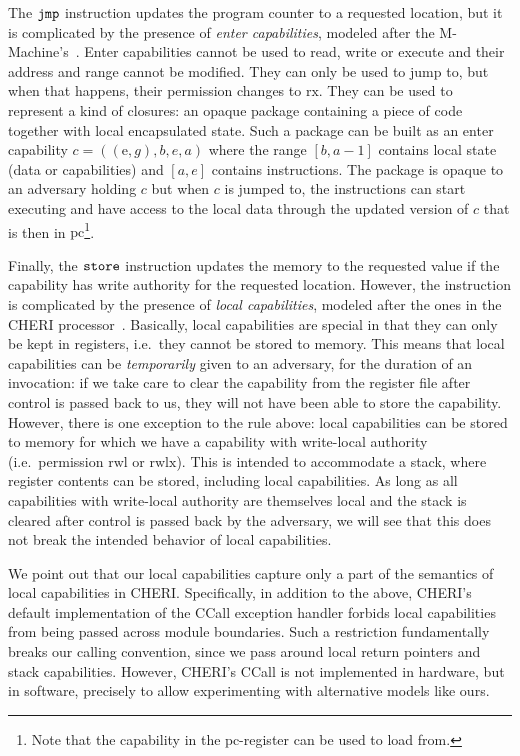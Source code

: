 \documentclass[compsoc,conference,letterpaper,fleqn]{IEEEtran}
\newcommand\lau[1]{{\color{purple} \sf \footnotesize {LS: #1}}\\}
\renewcommand\lau[1]{}
\newcommand{\var}[1]{\mathit{#1}}
\newcommand{\gl}{\var{g}}
\newcommand{\pcreg}{\mathrm{pc}}
\newcommand{\addr}{\var{a}}
\newcommand{\start}{\var{b}}
\newcommand{\addrend}{\var{e}}
\newcommand{\zinstr}[1]{\mathtt{#1}}
\newcommand{\oneinstr}[2]{
  \ifthenelse{\equal{#2}{}}
  {\zinstr{#1}}
  {\zinstr{#1} \; #2}
}
\newcommand{\jmp}[1]{\oneinstr{jmp}{#1}}
\newcommand{\twoinstr}[3]{
  \ifthenelse{\equal{#2#3}{}}
  {\zinstr{#1}}
  {\zinstr{#1} \; #2 \; #3}
}
\newcommand{\store}[2]{\twoinstr{store}{#1}{#2}}
\newcommand{\plainperm}[1]{\mathrm{#1}}
\newcommand{\exec}{\plainperm{rx}}
\newcommand{\entry}{\plainperm{e}}
\newcommand{\readwritel}{\plainperm{rwl}}
\newcommand{\rwl}{\readwritel}
\newcommand{\rwlx}{\plainperm{rwlx}}
\begin{document}
The $\jmp{}$ instruction updates the program counter to a requested location,
but it is complicated by the presence of \emph{enter capabilities}, modeled
after the M-Machine's~\citep{Carter:1994:HSF:195473.195579}. Enter capabilities
cannot be used to read, write or execute and their address and range cannot be
modified. They can only be used to jump to, but when that happens, their
permission changes to $\exec$. They can be used to represent a kind of closures:
an opaque package containing a piece of code together with local encapsulated
state. Such a package can be built as an enter capability $c =
((\entry,\gl),\start,\addrend,\addr)$ where the range $[\start,\addr-1]$
contains local state (data or capabilities) and $[\addr,\addrend]$ contains
instructions. The package is opaque to an adversary holding $c$ but when $c$ is
jumped to, the instructions can start executing and have access to the local
data through the updated version of $c$ that is then in $\pcreg$\footnote{Note
  that the capability in the $\pcreg$-register can be used to load from.}.

Finally, the $\store{}{}$ instruction updates the memory to the requested value
if the capability has write authority for the requested location. However, the
instruction is complicated by the presence of \emph{local capabilities}, modeled
after the ones in the CHERI processor~\citep{Watson2015Cheri}. Basically, local
capabilities are special in that they can only be kept in registers, i.e.\ they
cannot be stored to memory. This means that local capabilities can be
\emph{temporarily} given to an adversary, for the duration of an invocation: if
we take care to clear the capability from the register file after control is
passed back to us, they will not have been able to store the capability.
However, there is one exception to the rule above: local capabilities can be
stored to memory for which we have a capability with write-local authority
(i.e.\ permission $\rwl$ or $\rwlx$). This is intended to accommodate a stack,
where register contents can be stored, including local capabilities. As long as all
capabilities with write-local authority are themselves local and the stack is
cleared after control is passed back by the adversary, we will see that this
does not break the intended behavior of local capabilities.

We point out that our local capabilities capture only a part of the semantics of
local capabilities in CHERI. Specifically, in addition to the above, CHERI's
default implementation of the CCall exception handler forbids local capabilities
from being passed across module boundaries. Such a restriction fundamentally
breaks our calling convention, since we pass around local return pointers and
stack capabilities. However, CHERI's CCall is not implemented in hardware, but
in software, precisely to allow experimenting with alternative models like ours.
\end{document}
